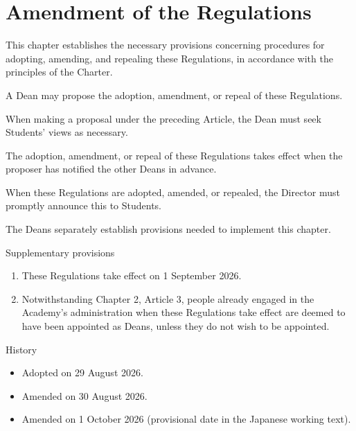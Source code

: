 \newpage
\chapter{Amendment of the Regulations}
\begin{articles}
  \item This chapter establishes the necessary provisions concerning procedures for adopting, amending, and repealing these Regulations, in accordance with the principles of the Charter.
  \item A Dean may propose the adoption, amendment, or repeal of these Regulations.
  \item When making a proposal under the preceding Article, the Dean must seek Students' views as necessary.
  \item The adoption, amendment, or repeal of these Regulations takes effect when the proposer has notified the other Deans in advance.
  \item When these Regulations are adopted, amended, or repealed, the Director must promptly announce this to Students.
  \item The Deans separately establish provisions needed to implement this chapter.
\end{articles}

\bigskip
\noindent Supplementary provisions
\begin{enumerate}[label=\arabic*.,labelsep=.5em,leftmargin=*]
  \item These Regulations take effect on 1 September 2026.
  \item Notwithstanding Chapter 2, Article 3, people already engaged in the Academy's administration when these Regulations take effect are deemed to have been appointed as Deans, unless they do not wish to be appointed.
\end{enumerate}

\bigskip
\noindent History
\begin{itemize}
  \item Adopted on 29 August 2026.
  \item Amended on 30 August 2026.
  \item Amended on 1 October 2026 (provisional date in the Japanese working text).
\end{itemize}
